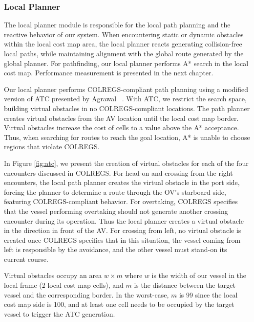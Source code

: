         \subsubsection{Local Planner}
        \label{sec:local_planner}
        
            The local planner module is responsible for the local path planning and the reactive behavior of our system. When encountering static or dynamic obstacles within the local cost map area, the local planner reacts generating collision-free local paths, while maintaining alignment with the global route generated by the global planner. For pathfinding, our local planner performs A* search in the local cost map. Performance measurement is presented in the next chapter.
            
            Our local planner performs \ac{COLREGS}-compliant path planning using a modified version of \ac{ATC} presented by Agrawal \etal~\cite{Agrawal2015COLREGS}. With \ac{ATC}, we restrict the search space, building virtual obstacles in no \ac{COLREGS}-compliant locations. The path planner creates virtual obstacles from the \ac{AV} location until the local cost map border. Virtual obstacles increase the cost of cells to a value above the A* acceptance. Thus, when searching for routes to reach the goal location, A* is unable to choose regions that violate \ac{COLREGS}.
            
            In Figure \ref{fig:atc}, we present the creation of virtual obstacles for each of the four encounters discussed in \ac{COLREGS}. For head-on and crossing from the right encounters, the local path planner creates the virtual obstacle in the port side, forcing the planner to determine a route through the \ac{OV}'s starboard side, featuring \ac{COLREGS}-compliant behavior. For overtaking, \ac{COLREGS} specifies that the vessel performing overtaking should not generate another crossing encounter during its operation. Thus the local planner creates a virtual obstacle in the direction in front of the \ac{AV}. For crossing from left, no virtual obstacle is created once \ac{COLREGS} specifies that in this situation, the vessel coming from left is responsible by the avoidance, and the other vessel must stand-on its current course.
            
            Virtual obstacles occupy an area $w \times m$ where $w$ is the width of our vessel in the local frame (2 local cost map cells), and $m$ is the distance between the target vessel and the corresponding border. In the worst-case, $m$ is 99 since the local cost map side is 100, and at least one cell needs to be occupied by the target vessel to trigger the \ac{ATC} generation. 
            
